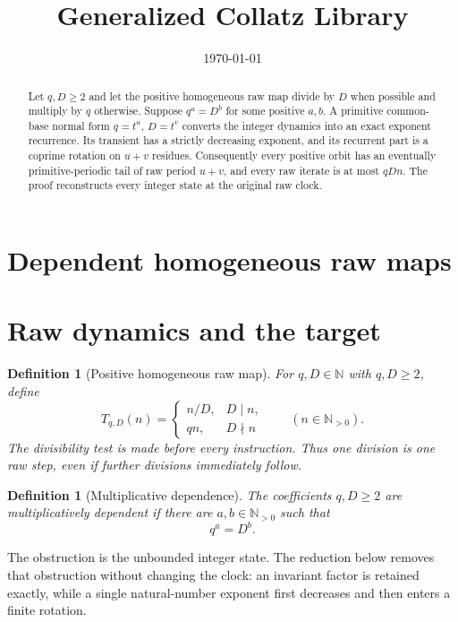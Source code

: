 \documentclass[11pt,letterpaper]{article}
\title{Generalized Collatz Library}
\author{}
\date{\today}
\newcommand{\N}{\mathbb{N}}
\newtheorem{definition}[theorem]{Definition}
\begin{document}
\maketitle
\section*{Dependent homogeneous raw maps}

\begin{abstract}
Let $q,D\geq2$ and let the positive homogeneous raw map divide by $D$ when
possible and multiply by $q$ otherwise.  Suppose $q^a=D^b$ for some positive
$a,b$.  A primitive common-base normal form $q=t^u$, $D=t^v$ converts the
integer dynamics into an exact exponent recurrence.  Its transient has a
strictly decreasing exponent, and its recurrent part is a coprime rotation
on $u+v$ residues.  Consequently every positive orbit has an eventually
primitive-periodic tail of raw period $u+v$, and every raw iterate is at most
$qDn$.  The proof reconstructs every integer state at the original raw clock.
\end{abstract}

\section{Raw dynamics and the target}

\begin{definition}[Positive homogeneous raw map]
\leavevmode\par
For $q,D\in\N$ with $q,D\geq2$, define
\[
 T_{q,D}(n)=
 \begin{cases}
  n/D,&D\mid n,\\
  qn,&D\nmid n
 \end{cases}
 \qquad(n\in\N_{>0}).
\]
The divisibility test is made before every instruction.  Thus one division is
one raw step, even if further divisions immediately follow.
\end{definition}

\begin{definition}[Multiplicative dependence]
The coefficients $q,D\geq2$ are multiplicatively dependent if there are
$a,b\in\N_{>0}$ such that
\[
 q^a=D^b.
\]
\end{definition}

The obstruction is the unbounded integer state.  The reduction below removes
that obstruction without changing the clock: an invariant factor is retained
exactly, while a single natural-number exponent first decreases and then
enters a finite rotation.
\end{document}
